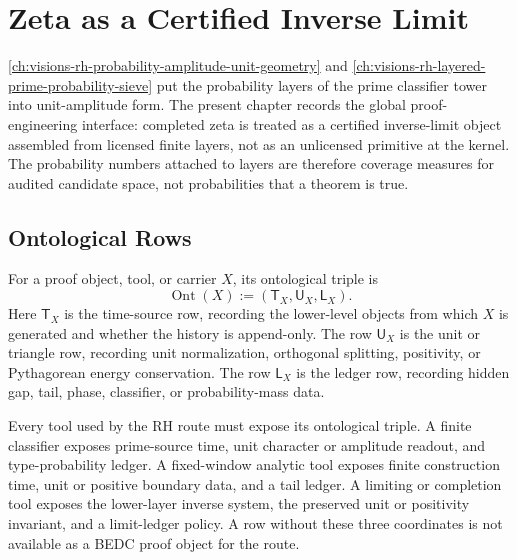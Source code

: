 \chapter{Zeta as a Certified Inverse Limit}
\label{ch:visions-rh-zeta-certified-inverse-limit}

\autoref{ch:visions-rh-probability-amplitude-unit-geometry} and
\autoref{ch:visions-rh-layered-prime-probability-sieve} put the
probability layers of the prime classifier tower into unit-amplitude
form.  The present chapter records the global proof-engineering
interface: completed zeta is treated as a certified inverse-limit object
assembled from licensed finite layers, not as an unlicensed primitive
at the kernel.  The probability numbers attached to layers are therefore
coverage measures for audited candidate space, not probabilities that a
theorem is true.

\section{Ontological Rows}
\label{sec:rh-zeta-certified-inverse-limit-ontological-rows}

\begin{definition}
\label{def:rh-ontological-triple}
For a proof object, tool, or carrier $X$, its ontological triple is
$$
\operatorname{Ont}(X):=(\mathsf T_X,\mathsf U_X,\mathsf L_X).
$$
Here $\mathsf T_X$ is the time-source row, recording the lower-level
objects from which $X$ is generated and whether the history is
append-only.  The row $\mathsf U_X$ is the unit or triangle row,
recording unit normalization, orthogonal splitting, positivity, or
Pythagorean energy conservation.  The row $\mathsf L_X$ is the ledger
row, recording hidden gap, tail, phase, classifier, or probability-mass
data.
\end{definition}

\begin{principle}
\label{prin:rh-zeta-route-tools-require-ontological-triples}
Every tool used by the RH route must expose its ontological triple.  A
finite classifier exposes prime-source time, unit character or amplitude
readout, and type-probability ledger.  A fixed-window analytic tool
exposes finite construction time, unit or positive boundary data, and a
tail ledger.  A limiting or completion tool exposes the lower-layer
inverse system, the preserved unit or positivity invariant, and a
limit-ledger policy.  A row without these three coordinates is not
available as a BEDC proof object for the route.
\end{principle}

